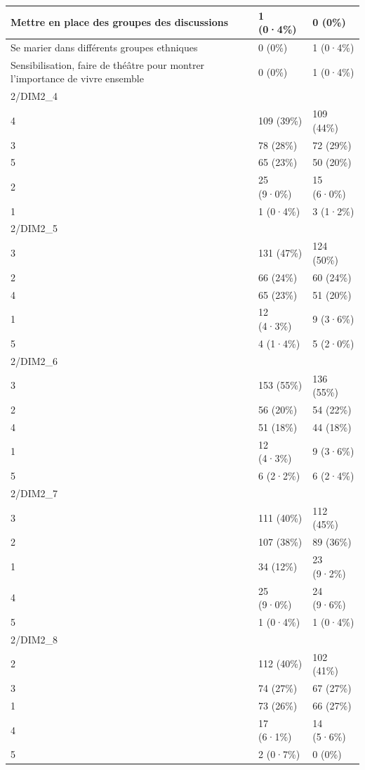 \documentclass[
]{book}
\begin{document}
\begin{tabular}{l|l|l}
\hline
Mettre en place des groupes des discussions & 1 (0·4\%) & 0 (0\%)\\
\hline
Se marier dans différents groupes ethniques & 0 (0\%) & 1 (0·4\%)\\
\hline
Sensibilisation, faire de théâtre pour montrer l'importance de vivre ensemble & 0 (0\%) & 1 (0·4\%)\\
\hline
2/DIM2\_4 &  & \\
\hline
4 & 109 (39\%) & 109 (44\%)\\
\hline
3 & 78 (28\%) & 72 (29\%)\\
\hline
5 & 65 (23\%) & 50 (20\%)\\
\hline
2 & 25 (9·0\%) & 15 (6·0\%)\\
\hline
1 & 1 (0·4\%) & 3 (1·2\%)\\
\hline
2/DIM2\_5 &  & \\
\hline
3 & 131 (47\%) & 124 (50\%)\\
\hline
2 & 66 (24\%) & 60 (24\%)\\
\hline
4 & 65 (23\%) & 51 (20\%)\\
\hline
1 & 12 (4·3\%) & 9 (3·6\%)\\
\hline
5 & 4 (1·4\%) & 5 (2·0\%)\\
\hline
2/DIM2\_6 &  & \\
\hline
3 & 153 (55\%) & 136 (55\%)\\
\hline
2 & 56 (20\%) & 54 (22\%)\\
\hline
4 & 51 (18\%) & 44 (18\%)\\
\hline
1 & 12 (4·3\%) & 9 (3·6\%)\\
\hline
5 & 6 (2·2\%) & 6 (2·4\%)\\
\hline
2/DIM2\_7 &  & \\
\hline
3 & 111 (40\%) & 112 (45\%)\\
\hline
2 & 107 (38\%) & 89 (36\%)\\
\hline
1 & 34 (12\%) & 23 (9·2\%)\\
\hline
4 & 25 (9·0\%) & 24 (9·6\%)\\
\hline
5 & 1 (0·4\%) & 1 (0·4\%)\\
\hline
2/DIM2\_8 &  & \\
\hline
2 & 112 (40\%) & 102 (41\%)\\
\hline
3 & 74 (27\%) & 67 (27\%)\\
\hline
1 & 73 (26\%) & 66 (27\%)\\
\hline
4 & 17 (6·1\%) & 14 (5·6\%)\\
\hline
5 & 2 (0·7\%) & 0 (0\%)\\
\hline

\end{tabular}
\end{document}
